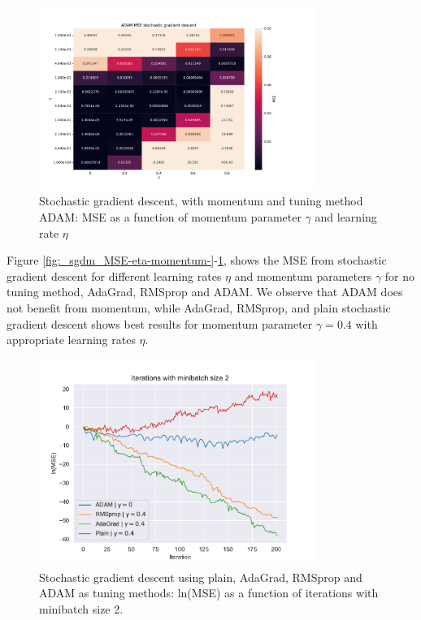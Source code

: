 \begin{figure}[H]
\centering
\includegraphics[width=0.8\textwidth]{Figures/PartA/ADAM_sgdm_MSE(eta,momentum)}
\caption{Stochastic gradient descent, with momentum and tuning method ADAM: MSE
    as a function of momentum parameter $\gamma$ and learning rate \(\eta \)	 }
\label{fig:ADAM_sgdm_MSE-eta-momentum-}
\end{figure}

Figure \ref{fig:_sgdm_MSE-eta-momentum-}-\ref{fig:ADAM_sgdm_MSE-eta-momentum-}, shows the MSE from stochastic gradient descent for different
learning rates $\eta $ and momentum parameters $\gamma $ for no tuning method, AdaGrad, RMSprop and ADAM. We observe that ADAM does not benefit 
from momentum, while AdaGrad, RMSprop, and plain stochastic gradient descent shows best results for momentum parameter $\gamma =0.4$ with appropriate 
learning rates $\eta $.  


\begin{figure}[H]
\centering
\includegraphics[width=0.8\textwidth]{Figures/PartA/minibatch_2_MSE(iter).pdf}
\caption{Stochastic gradient descent using plain, AdaGrad, RMSprop and ADAM as tuning methods: ln(MSE) as a function of iterations with minibatch size 2.}
\label{fig:minibatch_2_MSE-iter}
\end{figure}

